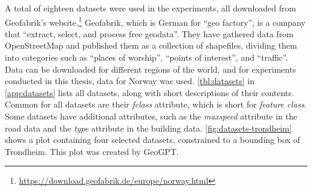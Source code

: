\begin{comment}
        \midrule
        Outdoor Recreation Areas                  & The purpose of the dataset is to provide an overview of areas that are important for the public's outdoor life, and it should be easy to account for which assessments and criteria have been the basis for the work and the final product.                                                       \\
        \midrule
        Cultural Monuments - Protected Buildings  & Buildings and churches that are automatically, decision, regulation, or temporarily protected under law and churches that have the status as listed.                                                                                                                                              \\
        \midrule
        Flood Zones                               & Flood zones show areas that are flooded by different flood sizes (recurrence interval). Flood zones are prepared for 20-, 200-, and 1000-year floods.                                                                                                                                             \\
        \midrule
        Quick Clay Zones                          & Provides an overview of zones with potential danger (precautionary areas) for major quick clay landslides.                                                                                                                                                                                        \\
        \bottomrule
    \end{tabularx}
\end{table}

\end{comment}

A total of eighteen datasets were used in the experiments, all downloaded from Geofabrik's website.\footnote{\url{https://download.geofabrik.de/europe/norway.html}} Geofabrik, which is German for \enquote{geo factory}, is a company that \enquote{extract, select, and process free geodata}. They have gathered data from OpenStreetMap and published them as a collection of shapefiles, dividing them into categories such as \enquote{places of worship}, \enquote{points of interest}, and \enquote{traffic}. Data can be downloaded for different regions of the world, and for experiments conducted in this thesis, data for Norway was used. \autoref{tbl:datasets} in \autoref{app:datasets} lists all datasets, along with short descriptions of their contents. Common for all datasets are their \emph{fclass} attribute, which is short for \emph{feature class}. Some datasets have additional attributes, such as the \emph{maxspeed} attribute in the road data and the \emph{type} attribute in the building data. \autoref{fig:datasets-trondheim} shows a plot containing four selected datasets, constrained to a bounding box of Trondheim. This plot was created by GeoGPT.

